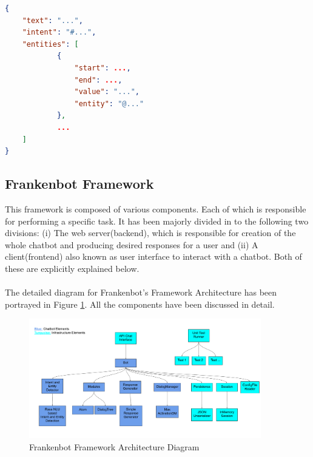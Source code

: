  \begin{lstlisting}[language=json,firstnumber=1]
{
    "text": "...",
    "intent": "#...",
    "entities": [
            {
                "start": ...,
                "end": ...,
                "value": "...",
                "entity": "@..."
            },
            ...
    ]
}
\end{lstlisting}

\subsection{Frankenbot Framework}
This framework is composed of various components. Each of which is responsible for performing a specific task. It has been majorly divided in to the following two divisions: (i) The web server(backend), which is responsible for creation of the whole chatbot and producing desired responses for a user and (ii) A client(frontend) also known as user interface to interact with a chatbot. Both of these are explicitly explained below.
\\~\\
The detailed diagram for Frankenbot's Framework Architecture has been portrayed in Figure \ref{fig:frankArch}. All the components have been discussed in detail.

\begin{figure}[!h]
    \centering
    \includegraphics[width=0.9\textwidth]{img/Frankenbot_Architecture_Diagram_Updated.pdf}
    \caption{Frankenbot Framework Architecture Diagram}
    \label{fig:frankArch}
\end{figure} 

